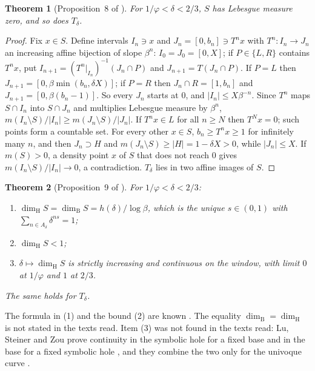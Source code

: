 \documentclass[11pt]{amsart}
\newtheorem{theorem}{Theorem}[section]
\theoremstyle{remark}
\newcommand{\dimH}{\dim_{\mathrm H}}
\newcommand{\dimB}{\dim_{\mathrm B}}
\begin{document}
\begin{theorem}[Proposition~8 of \cite{note}]\label{thm:p8}
For $1/\varphi<\delta<2/3$, $S$ has Lebesgue measure zero, and so does $T_\delta$.
\end{theorem}

\begin{proof}
Fix $x\in S$. Define intervals $I_n\ni x$ and $J_n=[0,b_n]\ni T^nx$ with $T^n\colon I_n\to J_n$ an increasing affine bijection of slope $\beta^n$: $I_0=J_0=[0,X]$; if $P\in\{L,R\}$ contains $T^nx$, put $I_{n+1}=(T^n|_{I_n})^{-1}(J_n\cap P)$ and $J_{n+1}=T(J_n\cap P)$. If $P=L$ then $J_{n+1}=[0,\beta\min(b_n,\delta X)]$; if $P=R$ then $J_n\cap R=[1,b_n]$ and $J_{n+1}=[0,\beta(b_n-1)]$. So every $J_n$ starts at $0$, and $|I_n|\le X\beta^{-n}$. Since $T^n$ maps $S\cap I_n$ into $S\cap J_n$ and multiplies Lebesgue measure by $\beta^n$, $m(I_n\setminus S)/|I_n|\ge m(J_n\setminus S)/|J_n|$.
If $T^nx\in L$ for all $n\ge N$ then $T^Nx=0$; such points form a countable set. For every other $x\in S$, $b_n\ge T^nx\ge1$ for infinitely many $n$, and then $J_n\supset H$ and $m(J_n\setminus S)\ge|H|=1-\delta X>0$, while $|J_n|\le X$. If $m(S)>0$, a density point $x$ of $S$ that does not reach $0$ gives $m(I_n\setminus S)/|I_n|\to0$, a contradiction. $T_\delta$ lies in two affine images of $S$.
\end{proof}

\begin{theorem}[Proposition~9 of \cite{note}]\label{thm:p9}
For $1/\varphi<\delta<2/3$:
\begin{enumerate}
\item $\dimH S=\dimB S=h(\delta)/\log\beta$, which is the unique $s\in(0,1)$ with $\sum_{n\in A_\delta}\delta^{ns}=1$;
\item $\dimH S<1$;
\item $\delta\mapsto\dimH S$ is strictly increasing and continuous on the window, with limit $0$ at $1/\varphi$ and $1$ at $2/3$.
\end{enumerate}
The same holds for $T_\delta$.
\end{theorem}

The formula in (1) and the bound (2) are known \cite{LSZ}. The equality $\dimB=\dimH$ is not stated in the texts read. Item (3) was not found in the texts read: Lu, Steiner and Zou prove continuity in the symbolic hole for a fixed base \cite[Theorem~1.4]{LSZ} and in the base for a fixed symbolic hole \cite[Lemma~3.16]{LSZ}, and they combine the two only for the univoque curve \cite[Theorem~1.5]{LSZ}.
\end{document}
